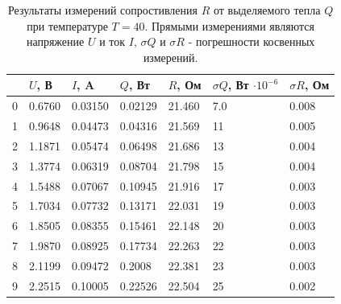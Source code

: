 \documentclass[12pt]{article}
\begin{document}
\begin{table}[H]
    \centering
    \begin{tabular}{|l|l|l|l|l|l|l|}
        \hline
          & $U$, В & $I$, A  & $Q$, Вт & $R$, Ом & $\sigma Q$, Вт $\cdot 10^{-6}$ & $\sigma R$, Ом \\
        \hline
        0 & 0.6760 & 0.03150 & 0.02129 & 21.460  & 7.0                            & 0.008          \\
        1 & 0.9648 & 0.04473 & 0.04316 & 21.569  & 11                             & 0.005          \\
        2 & 1.1871 & 0.05474 & 0.06498 & 21.686  & 13                             & 0.004          \\
        3 & 1.3774 & 0.06319 & 0.08704 & 21.798  & 15                             & 0.004          \\
        4 & 1.5488 & 0.07067 & 0.10945 & 21.916  & 17                             & 0.003          \\
        5 & 1.7034 & 0.07732 & 0.13171 & 22.031  & 19                             & 0.003          \\
        6 & 1.8505 & 0.08355 & 0.15461 & 22.148  & 20                             & 0.003          \\
        7 & 1.9870 & 0.08925 & 0.17734 & 22.263  & 22                             & 0.003          \\
        8 & 2.1199 & 0.09472 & 0.2008  & 22.381  & 23                             & 0.003          \\
        9 & 2.2515 & 0.10005 & 0.22526 & 22.504  & 25                             & 0.002          \\
        \hline
    \end{tabular}
    
    \caption{Результаты измерений сопростивления \(R\) от выделяемого тепла \(Q\) при температуре \(T = 40\)\textcelsius.
        Прямыми измерениями являются напряжение \(U\) и ток \(I\), \(\sigma Q\) и \(\sigma R\) - погрешности косвенных измерений.}
    \label{tab:3}
\end{table}
\end{document}
